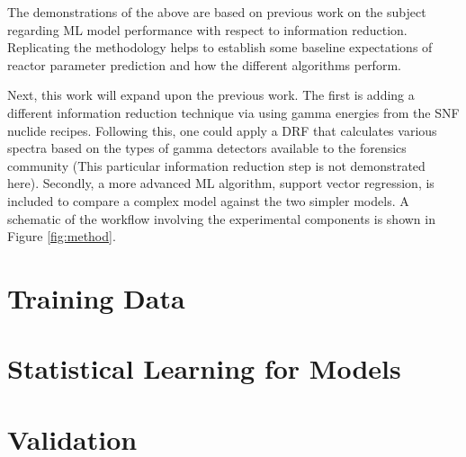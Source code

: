 The demonstrations of the above are based on previous work on the subject
\cite{dayman_feasibility_2013} regarding \gls{ML} model performance
with respect to information reduction.  Replicating the methodology helps to
establish some baseline expectations of reactor parameter prediction and how
the different algorithms perform. 

Next, this work will expand upon the previous work.  The first is adding a
different information reduction technique via using gamma energies from the
\gls{SNF} nuclide recipes.  Following this, one could apply a \gls{DRF} that
calculates various spectra based on the types of gamma detectors available to
the forensics community (This particular information reduction step is not
demonstrated here).  Secondly, a more advanced \gls{ML} algorithm,
support vector regression, is included to compare a complex model against the
two simpler models.  A schematic of the workflow involving the experimental
components is shown in Figure \ref{fig:method}.

\section{Training Data}
\label{sec:training}


\section{Statistical Learning for Models}
\label{sec:statmodel}


\section{Validation}
\label{sec:valid}


